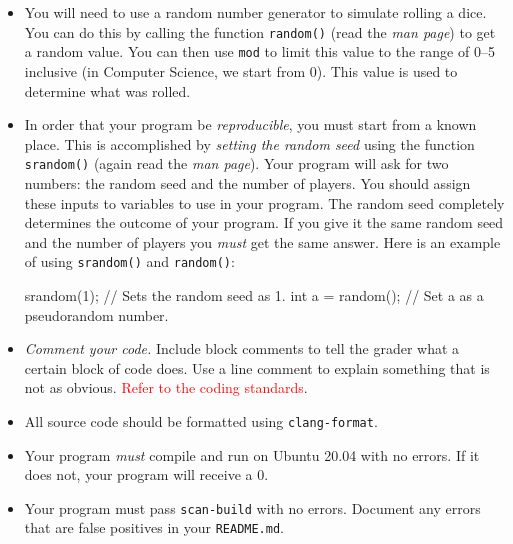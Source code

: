 \documentclass{article}
\begin{document}
\begin{itemize}

\item You will need to use a random number generator to simulate
rolling a dice. You can do this by calling the function \texttt{random()}
(read the \emph{man page}) to get a random value. You can then use \texttt{mod}
to limit this value to the range of 0--5 inclusive (in Computer Science, we start from 0).
This value is used to determine what was rolled.

\item In order that your program be \emph{reproducible}, you must start from a
known place. This is accomplished by \emph{setting the random seed}
using the function \texttt{srandom()} (again read the \emph{man page}).
Your program will ask for two numbers: the random seed and the
number of players. You should assign these inputs to variables to use
in your program. The random seed completely determines the outcome of your program. If you give it
the same random seed and the number of players you \emph{must} get
the same answer. Here is an example of using \texttt{srandom()} and
\texttt{random()}:
\begin{codelisting}{}
srandom(1);       // Sets the random seed as 1.
int a = random(); // Set a as a pseudorandom number.
\end{codelisting}

\item \emph{Comment your code.} Include block comments to tell the grader what a certain block of code does. Use a line comment to explain something that is not as obvious.
\textcolor{red}{Refer to the coding standards}.

\item All source code should be formatted using \texttt{clang-format}.

\item Your program \emph{must} compile and run on Ubuntu 20.04 with no
  errors. If it does not, your program will receive a 0.

\item Your program must pass \texttt{scan-build} with no errors.
  Document any errors that are false positives in your \texttt{README.md}.

\end{itemize}
\end{document}
